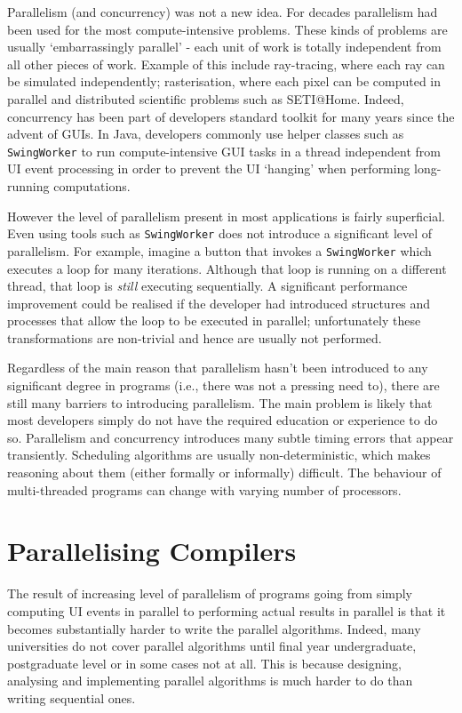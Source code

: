 Parallelism (and concurrency) was not a new idea. For decades parallelism had been used for the most compute-intensive problems. These kinds of problems are usually `embarrassingly parallel' - each unit of work is totally independent from all other pieces of work. Example of this include ray-tracing, where each ray can be simulated independently; rasterisation, where each pixel can be computed in parallel and distributed scientific problems such as SETI@Home. Indeed, concurrency has been part of developers standard toolkit for many years since the advent of GUIs. In Java, developers commonly use helper classes such as \texttt{SwingWorker} to run compute-intensive GUI tasks in a thread independent from UI event processing in order to prevent the UI `hanging' when performing long-running computations.

However the level of parallelism present in most applications is fairly superficial. Even using tools such as \texttt{SwingWorker} does not introduce a significant level of parallelism. For example, imagine a button that invokes a \texttt{SwingWorker} which executes a loop for many iterations. Although that loop is running on a different thread, that loop is \textit{still} executing sequentially. A significant performance improvement could be realised if the developer had introduced structures and  processes that allow the loop to be executed in parallel; unfortunately these transformations are non-trivial and hence are usually not performed.

Regardless of the main reason that parallelism hasn't been introduced to any significant degree in programs (i.e., there was not a pressing need to), there are still many barriers to introducing parallelism. The main problem is likely that most developers simply do not have the required education or experience to do so. Parallelism and concurrency introduces many subtle timing errors that appear transiently. Scheduling algorithms are usually non-deterministic, which makes reasoning about them (either formally or informally) difficult. The behaviour of multi-threaded programs can change with varying number of processors.

\section{Parallelising Compilers} \label{sec:introduction/compilers}
The result of increasing level of parallelism of programs going from simply computing UI events in parallel to performing actual results in parallel is that it becomes substantially harder to write the parallel algorithms. Indeed, many universities do not cover parallel algorithms until final year undergraduate, postgraduate level or in some cases not at all. This is because designing, analysing and implementing parallel algorithms is much harder to do than writing sequential ones.

